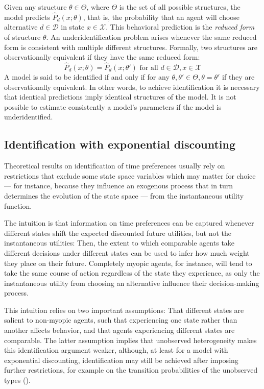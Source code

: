 Given any structure $\theta \in \Theta$, where $\Theta$ is the set of all possible structures, the model predicts $\hat{P}_d(x;\theta)$, that is, the probability that an agent will choose alternative $d \in \mathcal{D}$ in state $x \in \mathcal{X}$. This behavioral prediction is the \textit{reduced form} of structure $\theta$. An underidentification problem arises whenever the same reduced form is consistent with multiple different structures. Formally, two structures are observationally equivalent if they have the same reduced form:
\begin{equation}
\hat{P}_d(x;\theta) = \hat{P}_d(x;\theta')  \text{ for all } d \in \mathcal{D}, x \in \mathcal{X}
\end{equation}
A model is said to be identified if and only if for any $\theta, \theta' \in \Theta, \theta = \theta'$ if they are observationally equivalent.
In other words, to achieve identification it is necessary that identical predictions imply identical structures of the model. It is not possible to estimate consistently a model's parameters if the model is underidentified.


\subsection{Identification with exponential discounting}

Theoretical results on identification of time preferences usually rely on restrictions that exclude some state space variables which may matter for choice --- for instance, because they influence an exogenous process that in turn determines the evolution of the state space --- from the instantaneous utility function. 

The intuition is that information on time preferences can be captured whenever different states shift the expected discounted future utilities, but not the instantaneous utilities: Then, the extent to which comparable agents take different decisions under different states can be used to infer how much weight they place on their future. Completely myopic agents, for instance, will tend to take the same course of action regardless of the state they experience, as only the instantaneous utility from choosing an alternative influence their decision-making process. 

This intuition relies on two important assumptions: That different states are salient to non-myopic agents, such that experiencing one state rather than another affects behavior, and that agents experiencing different states are comparable. The latter assumption implies that unobserved heterogeneity makes this identification argument weaker, although, at least for a model with exponential discounting, identification may still be achieved after imposing further restrictions, for example on the transition probabilities of the unobserved types (\cite{MagnacThesmar2002}). 

